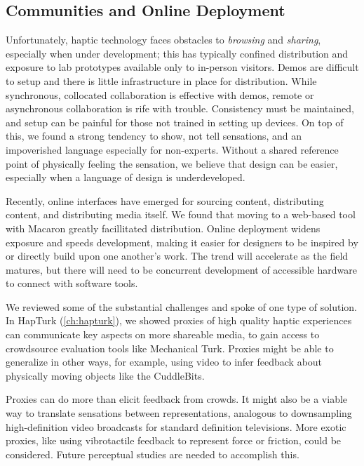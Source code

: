 \subsection{Communities and Online Deployment}
Unfortunately, haptic technology faces obstacles to \emph{browsing} and \emph{sharing}, especially when under development; this has typically confined distribution and exposure to lab prototypes available only to in-person visitors.
Demos are difficult to setup and there is little infrastructure in place for distribution.
While synchronous, collocated collaboration is effective with demos, remote or asynchronous collaboration is rife with trouble.
Consistency must be maintained, and setup can be painful for those not trained in setting up devices.
On top of this, we found a strong tendency to show, not tell sensations, and an impoverished language especially for non-experts.
Without a shared reference point of physically feeling the sensation, we believe that design can be easier, especially when a language of design is underdeveloped.

Recently, online interfaces have emerged for sourcing content, distributing content, and distributing media itself. 
We found that moving to a web-based tool with Macaron greatly facillitated distribution.
Online deployment widens exposure and speeds development, making it easier for designers to be inspired by or directly build upon one another's work. 
The trend will accelerate as the field matures, but there will need to be concurrent development of accessible hardware to connect with software tools.

    We reviewed some of the substantial challenges and spoke of one type of solution.
    In HapTurk (\autoref{ch:hapturk}), we showed proxies of high quality haptic experiences  can communicate key aspects on more shareable media, to gain access to crowdsource evaluation tools like Mechanical Turk.
    Proxies might be able to generalize in other ways, for example, using video to infer feedback about physically moving objects like the CuddleBits. %

    Proxies can do more than elicit feedback from crowds.
    It might also be a viable way to translate sensations between representations, analogous to downsampling high-definition video broadcasts for standard definition televisions.
    More exotic proxies, like using vibrotactile feedback to represent force or friction, could be considered. 
    Future perceptual studies are needed to accomplish this.
    
